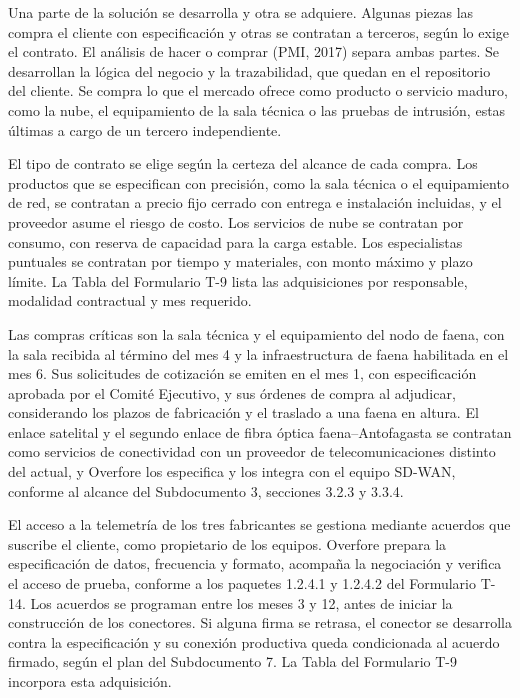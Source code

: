 \documentclass[subdoc]{../../comun/overfore}
\begin{document}
Una parte de la solución se desarrolla y otra se adquiere. Algunas piezas las compra el cliente con especificación y otras se contratan a terceros, según lo exige el contrato. El análisis de hacer o comprar (PMI, 2017) separa ambas partes. Se desarrollan la lógica del negocio y la trazabilidad, que quedan en el repositorio del cliente. Se compra lo que el mercado ofrece como producto o servicio maduro, como la nube, el equipamiento de la sala técnica o las pruebas de intrusión, estas últimas a cargo de un tercero independiente.

El tipo de contrato se elige según la certeza del alcance de cada compra. Los productos que se especifican con precisión, como la sala técnica o el equipamiento de red, se contratan a precio fijo cerrado con entrega e instalación incluidas, y el proveedor asume el riesgo de costo. Los servicios de nube se contratan por consumo, con reserva de capacidad para la carga estable. Los especialistas puntuales se contratan por tiempo y materiales, con monto máximo y plazo límite. La Tabla  del Formulario T-9 lista las adquisiciones por responsable, modalidad contractual y mes requerido.

Las compras críticas son la sala técnica y el equipamiento del nodo de faena, con la sala recibida al término del mes 4 y la infraestructura de faena habilitada en el mes 6. Sus solicitudes de cotización se emiten en el mes 1, con especificación aprobada por el Comité Ejecutivo, y sus órdenes de compra al adjudicar, considerando los plazos de fabricación y el traslado a una faena en altura. El enlace satelital y el segundo enlace de fibra óptica faena–Antofagasta se contratan como servicios de conectividad con un proveedor de telecomunicaciones distinto del actual, y Overfore los especifica y los integra con el equipo SD-WAN, conforme al alcance del Subdocumento 3, secciones 3.2.3 y 3.3.4.

El acceso a la telemetría de los tres fabricantes se gestiona mediante acuerdos que suscribe el cliente, como propietario de los equipos. Overfore prepara la especificación de datos, frecuencia y formato, acompaña la negociación y verifica el acceso de prueba, conforme a los paquetes 1.2.4.1 y 1.2.4.2 del Formulario T-14. Los acuerdos se programan entre los meses 3 y 12, antes de iniciar la construcción de los conectores. Si alguna firma se retrasa, el conector se desarrolla contra la especificación y su conexión productiva queda condicionada al acuerdo firmado, según el plan del Subdocumento 7. La Tabla  del Formulario T-9 incorpora esta adquisición.
\end{document}
